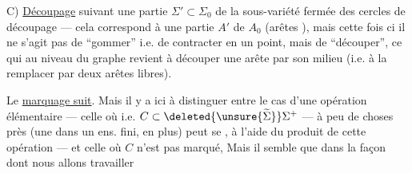 C) \uline{Découpage}  suivant une partie  $\Sigma'\subset\Sigma_{0}$ de la sous-variété fermée des cercles de découpage --- cela correspond à une partie $A'$ de $A_{0}$ (arêtes ), mais cette fois ci il ne s'agit pas de ``gommer'' i.e. de contracter en un point, mais de ``découper'', ce qui  au niveau du graphe revient à découper une arête par son milieu (i.e. à la remplacer par deux arêtes libres).

Le \uline{marquage suit}.  Mais il y a ici à distinguer entre le cas d'une opération élémentaire  --- celle où   i.e. $C\subset\deleted{\unsure{\widetilde{\Sigma}}}\Sigma^{+}$ ---  à peu de choses près (une  dans un ens. fini, \deleted{\unsure{)}} en plus) peut se , à l'aide du produit de cette opération --- et celle où $C$ n'est pas marqué, Mais il semble que dans la façon dont nous allons travailler
